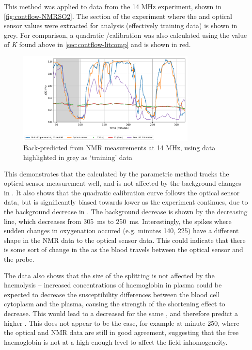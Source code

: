 This method was applied to data from the 14 MHz experiment, shown in \autoref{fig:contflow-NMRSO2}.
The section of the experiment where the \Ttwo and optical sensor \SOtwo values were extracted for analysis (effectively training data) is shown in grey.
For comparison, a quadratic \Rtwo/\SOtwo calibration was also calculated using the value of \textit{K} found above in \autoref{sec:contflow-litcomp} and is shown in red.

\begin{figure}[t]
\centering
\includegraphics[width=0.8\textwidth]{figures/contflow/calibratedNMRSO2.pdf}
\caption[Back-predicted \SOtwo from NMR measurements at 14 MHz]{Back-predicted \SOtwo from NMR measurements at 14 MHz, using data highlighted in grey as `training' data}
\label{fig:contflow-NMRSO2}
\end{figure}

This demonstrates that the \SOtwo calculated by the parametric method tracks the optical sensor measurement well, and is not affected by the background changes in \Ttwo.
It also shows that the quadratic calibration curve follows the optical sensor data, but is significantly biased towards lower \SOtwo as the experiment continues, due to the background decrease in \Ttwo.
The background decrease is shown by the decreasing \TtwoO line, which decreases from \SI{305}{ms} to \SI{250}{ms}.
Interestingly, the spikes where sudden changes in oxygenation occured (e.g. minutes 140, 225) have a different shape in the NMR data to the optical sensor data.
This could indicate that there is some sort of change in the \SOtwo as the blood travels between the optical sensor and the probe.

The data also shows that the size of the splitting is not affected by the haemolysis -- increased concentrations of haemoglobin in plasma could be expected to decrease the susceptibility differences between the blood cell cytoplasm and the plasma, causing the strength of the \Ttwo shortening effect to decrease.
This would lead to a decreased \Kzero for the same \SOtwo, and therefore predict a higher \SOtwo.
This does not appear to be the case, for example at minute 250, where the optical and NMR data are still in good agreement, suggesting that the free haemoglobin is not at a high enough level to affect the field inhomogeneity.


